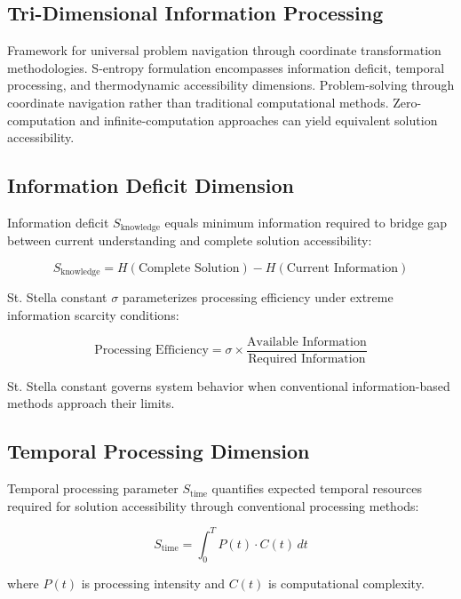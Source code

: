 \documentclass[12pt,a4paper]{article}
\begin{document}
\subsection{Tri-Dimensional Information Processing}

Framework for universal problem navigation through coordinate transformation methodologies. S-entropy formulation encompasses information deficit, temporal processing, and thermodynamic accessibility dimensions. Problem-solving through coordinate navigation rather than traditional computational methods. Zero-computation and infinite-computation approaches can yield equivalent solution accessibility.

\subsection{Information Deficit Dimension}

Information deficit $S_{\text{knowledge}}$ equals minimum information required to bridge gap between current understanding and complete solution accessibility:

\begin{equation}
S_{\text{knowledge}} = H(\text{Complete Solution}) - H(\text{Current Information})
\end{equation}

St. Stella constant $\sigma$ parameterizes processing efficiency under extreme information scarcity conditions:

\begin{equation}
\text{Processing Efficiency} = \sigma \times \frac{\text{Available Information}}{\text{Required Information}}
\end{equation}

St. Stella constant governs system behavior when conventional information-based methods approach their limits.

\subsection{Temporal Processing Dimension}

Temporal processing parameter $S_{\text{time}}$ quantifies expected temporal resources required for solution accessibility through conventional processing methods:

\begin{equation}
S_{\text{time}} = \int_0^T P(t) \cdot C(t) \, dt
\end{equation}

where $P(t)$ is processing intensity and $C(t)$ is computational complexity.
\end{document}
